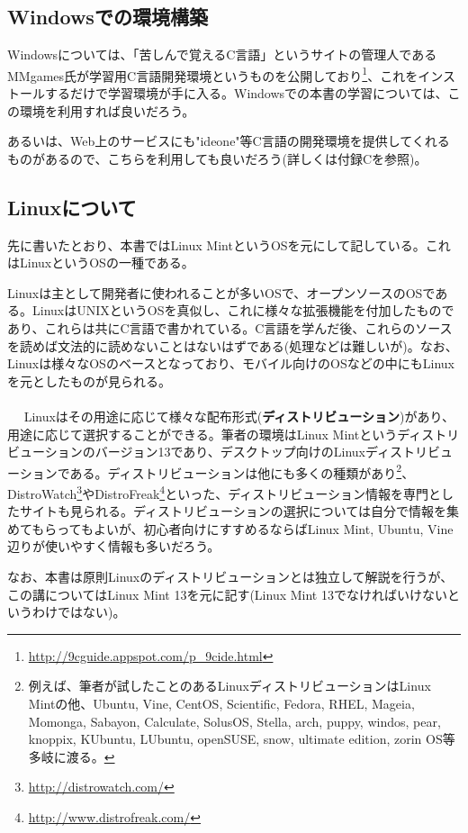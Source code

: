 \subsection{Windowsでの環境構築}
Windowsについては、「苦しんで覚えるC言語」というサイトの管理人であるMMgames氏が学習用C言語開発環境というものを公開しており\footnote{\url{http://9cguide.appspot.com/p_9cide.html}}、これをインストールするだけで学習環境が手に入る。Windowsでの本書の学習については、この環境を利用すれば良いだろう。

あるいは、Web上のサービスにも"ideone"等C言語の開発環境を提供してくれるものがあるので、こちらを利用しても良いだろう(詳しくは付録Cを参照)。

\subsection{Linuxについて}
先に書いたとおり、本書ではLinux MintというOSを元にして記している。これはLinuxというOSの一種である。

Linuxは主として開発者に使われることが多いOSで、オープンソースのOSである。LinuxはUNIXというOSを真似し、これに様々な拡張機能を付加したものであり、これらは共にC言語で書かれている。C言語を学んだ後、これらのソースを読めば文法的に読めないことはないはずである(処理などは難しいが)。なお、Linuxは様々なOSのベースとなっており、モバイル向けのOSなどの中にもLinuxを元としたものが見られる。
\\ \\　
Linuxはその用途に応じて様々な配布形式(\textbf{ディストリビューション})があり、用途に応じて選択することができる。筆者の環境はLinux Mintというディストリビューションのバージョン13であり、デスクトップ向けのLinuxディストリビューションである。ディストリビューションは他にも多くの種類があり\footnote{例えば、筆者が試したことのあるLinuxディストリビューションはLinux Mintの他、Ubuntu, Vine, CentOS, Scientific, Fedora, RHEL, Mageia, Momonga, Sabayon, Calculate, SolusOS, Stella, arch, puppy, windos, pear, knoppix, KUbuntu, LUbuntu, openSUSE, snow, ultimate edition, zorin OS等多岐に渡る。}、DistroWatch\footnote{\url{http://distrowatch.com/}}やDistroFreak\footnote{\url{http://www.distrofreak.com/}}といった、ディストリビューション情報を専門としたサイトも見られる。ディストリビューションの選択については自分で情報を集めてもらってもよいが、初心者向けにすすめるならばLinux Mint, Ubuntu, Vine辺りが使いやすく情報も多いだろう。

なお、本書は原則Linuxのディストリビューションとは独立して解説を行うが、この講についてはLinux Mint 13を元に記す(Linux Mint 13でなければいけないというわけではない)。

